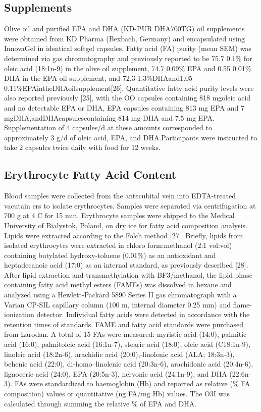 \documentclass[journal=jacsat,manuscript=article]{achemso}
\begin{document}
\subsection{Supplements}\label{supplements}

Olive oil and purified EPA and DHA (KD-PUR DHA700TG) oil supplements
were obtained from KD Pharma (Bexbach, Germany) and encapsulated using
InnovaGel in identical softgel capsules. Fatty acid (FA) purity (mean
SEM) was determined via gas chromatography and previously reported to be
75.7 0.1\% for oleic acid (18:1n-9) in the olive oil supplement, 74.7
0.09\% EPA and 0.55 0.01\% DHA in the EPA oil supplement, and 72.3
1.3\%DHAand1.05 0.11\%EPAintheDHAoilsupplement{[}26{]}. Quantitative
fatty acid purity levels were also reported previously {[}25{]}, with
the OO capsules containing 818 mgoleic acid and no detectable EPA or
DHA, EPA capsules containing 813 mg EPA and 7
mgDHA,andDHAcapsulescontaining 814 mg DHA and 7.5 mg EPA.
Supplementation of 4 capsules/d at these amounts corresponded to
approximately 3 g/d of oleic acid, EPA, and DHA.Participants were
instructed to take 2 capsules twice daily with food for 12 weeks.

\subsection{Erythrocyte Fatty Acid
Content}\label{erythrocyte-fatty-acid-content}

Blood samples were collected from the antecubital vein into EDTA-treated
vacutain ers to isolate erythrocytes. Samples were separated via
centrifugation at 700 g at 4 C for 15 min. Erythrocyte samples were
shipped to the Medical University of Białystok, Poland, on dry ice for
fatty acid composition analysis. Lipids were extracted according to the
Folch method {[}27{]}. Briefly, lipids from isolated erythrocytes were
extracted in chloro form:methanol (2:1 vol:vol) containing butylated
hydroxy-toluene (0.01\%) as an antioxidant and heptadecanoic acid (17:0)
as an internal standard, as previously described {[}28{]}. After lipid
extraction and transmethylation with BF3/methanol, the lipid phase
containing fatty acid methyl esters (FAMEs) was dissolved in hexane and
analyzed using a Hewlett-Packard 5890 Series II gas chromatograph with a
Varian CP-SIL capillary column (100 m, internal diameter 0.25 mm) and
flame-ionization detector. Individual fatty acids were detected in
accordance with the retention times of standards. FAME and fatty acid
standards were purchased from Larodan. A total of 15 FAs were measured:
myristic acid (14:0), palmitic acid (16:0), palmitoleic acid (16:1n-7),
stearic acid (18:0), oleic acid (C18:1n-9), linoleic acid (18:2n-6),
arachidic acid (20:0),-linolenic acid (ALA; 18:3n-3), behenic acid
(22:0), di-homo--linolenic acid (20:3n-6), arachidonic acid (20:4n-6),
lignoceric acid (24:0), EPA (20:5n-3), nervonic acid (24:1n-9), and DHA
(22:6n-3). FAs were standardized to haemoglobin (Hb) and reported as
relative (\% FA composition) values or quantitative (ng FA/mg Hb)
values. The O3I was calculated through summing the relative \% of EPA
and DHA.
\end{document}
